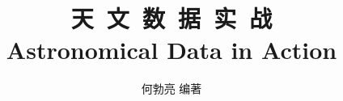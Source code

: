 \title{\hei\vspace*{-2cm} 天~文~数~据~实~战\\{\vspace*{-1.2cm} Astronomical Data in Action}}
\author{\guli 何勃亮\hspace{1em} \kai 编著}
\date{\vspace*{3cm}}
\maketitle